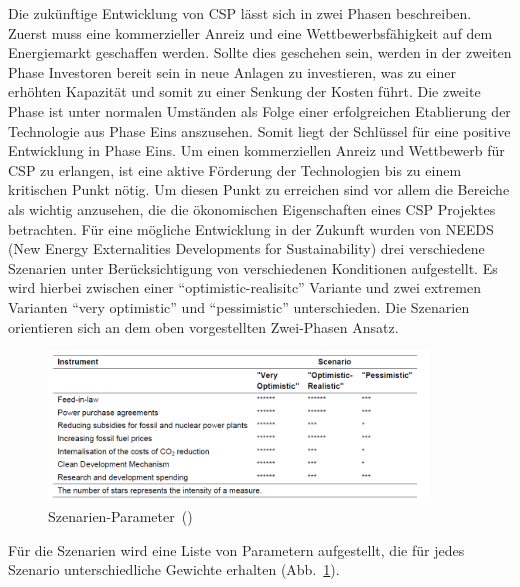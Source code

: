 Die zukünftige Entwicklung von CSP lässt sich in zwei Phasen beschreiben. Zuerst muss eine kommerzieller Anreiz und eine Wettbewerbsfähigkeit auf dem Energiemarkt geschaffen werden. Sollte dies geschehen sein, werden in der zweiten Phase Investoren bereit sein in neue Anlagen zu investieren, was zu einer erhöhten Kapazität und somit zu einer Senkung der Kosten führt. Die zweite Phase ist unter normalen Umständen als Folge einer erfolgreichen Etablierung der Technologie aus Phase Eins anszusehen. Somit liegt der Schlüssel für eine positive Entwicklung in Phase Eins. Um einen kommerziellen Anreiz und Wettbewerb für CSP zu erlangen, ist eine aktive Förderung der Technologien bis zu einem kritischen Punkt nötig. Um diesen Punkt zu erreichen sind vor allem die Bereiche als wichtig anzusehen, die die ökonomischen Eigenschaften eines CSP Projektes betrachten.
Für eine mögliche Entwicklung in der Zukunft wurden von NEEDS (New Energy Externalities Developments for Sustainability) drei verschiedene Szenarien unter Berücksichtigung von verschiedenen Konditionen aufgestellt. Es wird hierbei zwischen einer "`optimistic-realisitc"' Variante und zwei extremen Varianten "`very optimistic"' und "`pessimistic"' unterschieden. Die Szenarien orientieren sich an dem oben vorgestellten Zwei-Phasen Ansatz.

\begin{figure}[H]
	\centering
	\includegraphics[width=0.9\textwidth,trim=1 1 1 1,clip]{instruments_scenario.png}
	\caption{Szenarien-Parameter~(\cite{viebahn2008})}
	\label{fig:inst}
\end{figure}

Für die Szenarien wird eine Liste von Parametern aufgestellt, die für jedes Szenario unterschiedliche Gewichte erhalten (Abb.~\ref{fig:inst}).

